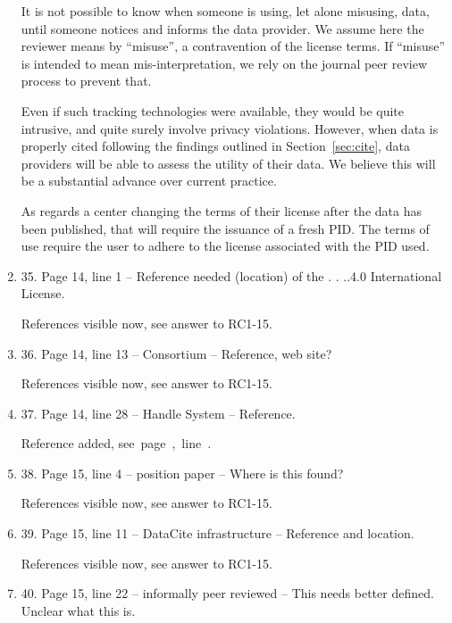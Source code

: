 \documentclass[gmd,manuscript]{copernicus}
\newcommand{\plref}[1]{\mbox{see page \pageref{p-#1}, line
    \lineref{l-#1}.}}
\newenvironment{answer}{\color{blue}}{}
\begin{document}
\begin{enumerate}[label=RC1-\arabic*,leftmargin=*]
  \begin{answer}
    It is not possible to know when someone is using, let alone
    misusing, data, until someone notices and informs the data
    provider. We assume here the reviewer means by ``misuse'', a
    contravention of the license terms. If ``misuse'' is intended to
    mean mis-interpretation, we rely on the journal peer review
    process to prevent that.

    Even if such tracking technologies were available, they would be
    quite intrusive, and quite surely involve privacy violations.
    However, when data is properly cited following the findings
    outlined in Section~\ref{sec:cite}, data providers will be able to
    assess the utility of their data. We believe this will be a
    substantial advance over current practice.

    As regards a center changing the terms of their license after the
    data has been published, that will require the issuance of a fresh
    PID. The terms of use require the user to adhere to the license
    associated with the PID used.
  \end{answer}
\item 35. Page 14, line 1 -- Reference needed (location) of the . .
  ..4.0 International License.

  \begin{answer}
    References visible now, see answer to RC1-15.
  \end{answer}
\item 36. Page 14, line 13 -- Consortium -- Reference, web site?

  \begin{answer}
    References visible now, see answer to RC1-15.
  \end{answer}
\item 37. Page 14, line 28 -- Handle System -- Reference.

  \begin{answer}
    Reference added, \plref{RC1-37}
  \end{answer}
\item 38. Page 15, line 4 -- position paper -- Where is this found?

  \begin{answer}
    References visible now, see answer to RC1-15.
  \end{answer}
\item 39. Page 15, line 11 -- DataCite infrastructure -- Reference and
  location.

  \begin{answer}
    References visible now, see answer to RC1-15.
  \end{answer}
\item 40. Page 15, line 22 -- informally peer reviewed -- This needs
  better defined. Unclear what this is.


\end{enumerate}
\end{document}
